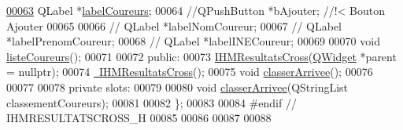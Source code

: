\begin{DoxyCode}
\hyperlink{class_i_h_m_resultats_cross_a0cec9448e3ac680fd93cff9c4c709e1b}{00063}         QLabel *\hyperlink{class_i_h_m_resultats_cross_a0cec9448e3ac680fd93cff9c4c709e1b}{labelCoureurs};
00064         \textcolor{comment}{//QPushButton *bAjouter; //!< Bouton Ajouter}
00065 
00066         \textcolor{comment}{// QLabel *labelNomCoureur;}
00067         \textcolor{comment}{// QLabel *labelPrenomCoureur;}
00068         \textcolor{comment}{// QLabel *labelINECoureur;}
00069 
00070         \textcolor{keywordtype}{void} \hyperlink{class_i_h_m_resultats_cross_a5e8e7f363a93e1e5e6b3c5eb0ad29c28}{listeCoureurs}();
00071 
00072     \textcolor{keyword}{public}:
00073         \hyperlink{class_i_h_m_resultats_cross_a94afa0356ebc98e497dfecca3e1bb00b}{IHMResultatsCross}(\hyperlink{class_q_widget}{QWidget} *parent = \textcolor{keyword}{nullptr});
00074         \hyperlink{class_i_h_m_resultats_cross_a62afe926862fddcb340e4a2c57c3cddf}{~IHMResultatsCross}();
00075         \textcolor{keywordtype}{void} \hyperlink{class_i_h_m_resultats_cross_a4311c35a2869a24be1a06d7410623eda}{classerArrivee}();
00076 
00077 
00078     \textcolor{keyword}{private} slots:
00079 
00080      \textcolor{keywordtype}{void} \hyperlink{class_i_h_m_resultats_cross_a4311c35a2869a24be1a06d7410623eda}{classerArrivee}(QStringList classementCoureurs);
00081 
00082 \};
00083 
00084 \textcolor{preprocessor}{#endif // IHMRESULTATSCROSS\_H}
00085 
00086 
00087 
00088 
\end{DoxyCode}
